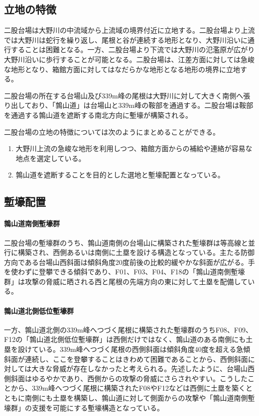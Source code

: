 \documentclass[14Q]{jsarticle}
\begin{document}
\subsection{立地の特徴}
二股台場は大野川の中流域から上流域の境界付近に立地する。二股台場より上流では大野川は蛇行を繰り返し、尾根と谷が連続する地形となり、大野川沿いに通行することは困難となる。一方、二股台場より下流では大野川の氾濫原が広がり大野川沿いに歩行することが可能となる。二股台場は、江差方面に対しては急峻な地形となり、箱館方面に対してはなだらかな地形となる地形の境界に立地する。

二股台場の所在する台場山及び339m峰の尾根は大野川に対して大きく南側へ張り出しており、「鶉山道」は台場山と339m峰の鞍部を通過する。二股台場は鞍部を通過する鶉山道を遮断する南北方向に塹壕が構築される。

二股台場の立地の特徴については次のようにまとめることができる。

\begin{enumerate}
\item 大野川上流の急峻な地形を利用しつつ、箱館方面からの補給や連絡が容易な地点を選定している。
\item 鶉山道を遮断することを目的とした選地と塹壕配置となっている。
\end{enumerate}

\subsection{塹壕配置}
\paragraph{鶉山道南側塹壕群}
二股台場の塹壕群のうち、鶉山道南側の台場山に構築された塹壕群は等高線と並行に構築され、西側あるいは南側に土塁を設ける構造となっている。主たる防御方向である台場山西斜面は傾斜角度20度前後の比較的緩やかな斜面が広がる。手を使わずに登攀できる傾斜であり、F01、F03、F04、F18の「鶉山道南側塹壕群」は攻撃の脅威に晒される西と尾根の先端方向の東に対して土塁を配備している。

\paragraph{鶉山道北側低位塹壕群}
一方、鶉山道北側の339m峰へつづく尾根に構築された塹壕群のうちF08、F09、F12の「鶉山道北側低位塹壕群」は西側だけではなく、鶉山道のある南側にも土塁を設けている。339m峰へつづく尾根の西側斜面は傾斜角度40度を超える急傾斜面が連続し、ここを登攀することはきわめて困難であることから、西側斜面に対しては大きな脅威が存在しなかったと考えられる。先述したように、台場山西側斜面はゆるやかであり、西側からの攻撃の脅威にさらされやすい。こうしたことから、339m峰へつづく尾根に構築されたF08やF12などは西側に土塁を築くとともに南側にも土塁を構築し、鶉山道に対して側面からの攻撃や「鶉山道南側塹壕群」の支援を可能にする塹壕構造となっている。
\end{document}
